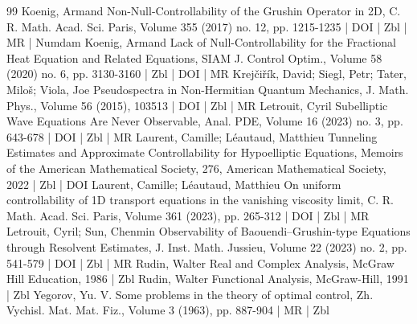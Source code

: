 \begin{thebibliography}{99}
Koenig, Armand Non-Null-Controllability of the Grushin Operator in 2D, C. R. Math. Acad. Sci. Paris, Volume 355 (2017) no. 12, pp. 1215-1235 | DOI | Zbl | MR | Numdam
Koenig, Armand Lack of Null-Controllability for the Fractional Heat Equation and Related Equations, SIAM J. Control Optim., Volume 58 (2020) no. 6, pp. 3130-3160 | Zbl | DOI | MR
Krejčiřík, David; Siegl, Petr; Tater, Miloš; Viola, Joe Pseudospectra in Non-Hermitian Quantum Mechanics, J. Math. Phys., Volume 56 (2015), 103513 | DOI | Zbl | MR
Letrouit, Cyril Subelliptic Wave Equations Are Never Observable, Anal. PDE, Volume 16 (2023) no. 3, pp. 643-678 | DOI | Zbl | MR
Laurent, Camille; Léautaud, Matthieu Tunneling Estimates and Approximate Controllability for Hypoelliptic Equations, Memoirs of the American Mathematical Society, 276, American Mathematical Society, 2022 | Zbl | DOI
Laurent, Camille; Léautaud, Matthieu On uniform controllability of 1D transport equations in the vanishing viscosity limit, C. R. Math. Acad. Sci. Paris, Volume 361 (2023), pp. 265-312 | DOI | Zbl | MR
Letrouit, Cyril; Sun, Chenmin Observability of Baouendi–Grushin-type Equations through Resolvent Estimates, J. Inst. Math. Jussieu, Volume 22 (2023) no. 2, pp. 541-579 | DOI | Zbl | MR
Rudin, Walter Real and Complex Analysis, McGraw Hill Education, 1986 | Zbl
Rudin, Walter Functional Analysis, McGraw-Hill, 1991 | Zbl
Yegorov, Yu. V. Some problems in the theory of optimal control, Zh. Vychisl. Mat. Mat. Fiz., Volume 3 (1963), pp. 887-904 | MR | Zbl
\end{thebibliography}
